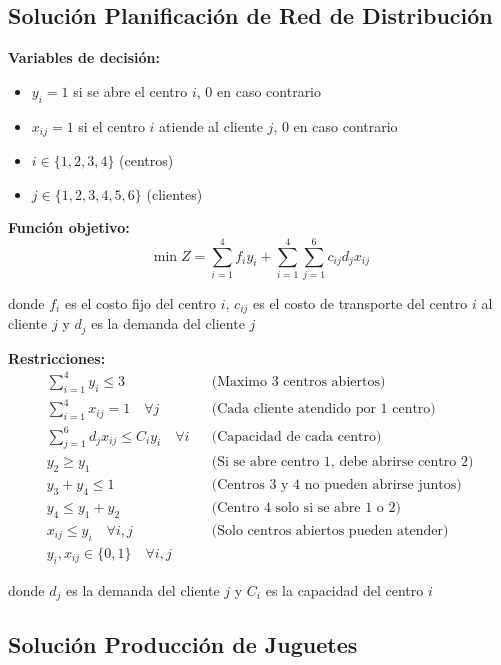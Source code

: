 \documentclass[12pt]{article}
\begin{document}
\subsection{Solución Planificación de Red de Distribución}

\textbf{Variables de decisión:}
\begin{itemize}
    \item $y_i = 1$ si se abre el centro $i$, 0 en caso contrario
    \item $x_{ij} = 1$ si el centro $i$ atiende al cliente $j$, 0 en caso contrario
    \item $i \in \{1, 2, 3, 4\}$ (centros)
    \item $j \in \{1, 2, 3, 4, 5, 6\}$ (clientes)
\end{itemize}

\textbf{Función objetivo:}
$$\min Z = \sum_{i=1}^{4} f_i y_i + \sum_{i=1}^{4} \sum_{j=1}^{6} c_{ij} d_j x_{ij}$$
\begin{center}
donde $f_i$ es el costo fijo del centro $i$, $c_{ij}$ es el costo de transporte del centro $i$ al cliente $j$ y $d_j$ es la demanda del cliente $j$
\end{center}

\textbf{Restricciones:}
\begin{align*}
    \sum_{i=1}^{4} y_i \leq 3 && \text{(Maximo 3 centros abiertos)} \\
    \sum_{i=1}^{4} x_{ij} = 1 \quad \forall j && \text{(Cada cliente atendido por 1 centro)} \\
    \sum_{j=1}^{6} d_j x_{ij} \leq C_i y_i \quad \forall i && \text{(Capacidad de cada centro)} \\
    y_2 \geq y_1 && \text{(Si se abre centro 1, debe abrirse centro 2)} \\
    y_3 + y_4 \leq 1 && \text{(Centros 3 y 4 no pueden abrirse juntos)} \\
    y_4 \leq y_1 + y_2 && \text{(Centro 4 solo si se abre 1 o 2)} \\
    x_{ij} \leq y_i \quad \forall i,j && \text{(Solo centros abiertos pueden atender)} \\
    y_i, x_{ij} \in \{0,1\} \quad \forall i,j
\end{align*}
\begin{center}
donde $d_j$ es la demanda del cliente $j$ y $C_i$ es la capacidad del centro $i$
\end{center}

\subsection{Solución Producción de Juguetes}
\end{document}
